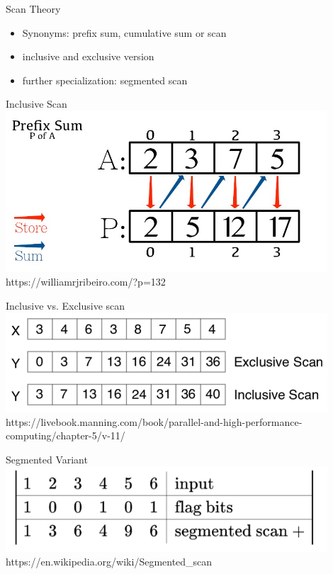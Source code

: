 \begin{frame}{Scan Theory}
	\begin{itemize}
		\item Synonyms: prefix sum, cumulative sum or scan
		\item inclusive and exclusive version
		\item further specialization: segmented scan
	\end{itemize}
\end{frame} 
\begin{frame}{Inclusive Scan}
	\centering
	\vspace{-5pt}
	\includegraphics[width=0.90\textwidth]{"wiki/prefix-sum.jpg"}
	\tiny https://williamrjribeiro.com/?p=132
\end{frame}
\begin{frame}{Inclusive vs. Exclusive scan}
	\centering
	\vspace{-5pt}
	\includegraphics[width=0.90\textwidth]{"wiki/scans.png"}
	\tiny https://livebook.manning.com/book/parallel-and-high-performance-computing/chapter-5/v-11/
\end{frame}
\begin{frame}{Segmented Variant}
	\centering
	\vspace{-5pt}
	\includegraphics[width=0.90\textwidth]{"wiki/SegmentedScan.png"}
	\tiny https://en.wikipedia.org/wiki/Segmented\_scan

\end{frame}

